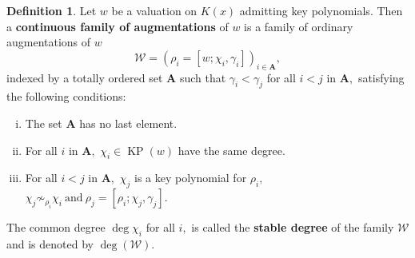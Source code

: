 \documentclass[11pt]{amsart}
\theoremstyle{definition}
\newtheorem{definition}[theorem]{Definition}
\theoremstyle{remark}
\newtheorem{remark}[theorem]{Remark}
\numberwithin{equation}{section}
\begin{document}
\begin{definition}\label{1.1.14}
	Let $w$ be a valuation on $K(x)$ admitting key polynomials. Then a {\bf continuous family of augmentations} of $w$ is a family of ordinary augmentations of $w$  $$\mathcal{W} =(\rho_i=[w;\chi_i,\gamma_i])_{i\in	\mathbf{A}},$$ indexed by a totally ordered set $\mathbf{A}$ such that $\gamma_i<\gamma_j$ for all $i<j$ in $\mathbf{A},$ satisfying the following conditions:
	\begin{enumerate}[(i)]
		\item The set $\mathbf{A}$  has no last element.
		\item For all $i$ in $\mathbf{A},$ $\chi_i\in \operatorname{KP}(w)$ have the same degree.
		\item For all $i<j$ in $\mathbf{A},$ $\chi_j$ is a  key polynomial for $\rho_i,$ 
		$\chi_j\not\sim_{\rho_i}\chi_i~\text{and}~ \rho_j=[\rho_i;\chi_j,\gamma_j].$
	\end{enumerate}
\end{definition}
The common degree $\deg\chi_i$ for all $i,$ is called the {\bf stable degree} of the family $\mathcal{W}$ and is denoted by $\deg (\mathcal{W}).$
\end{document}
